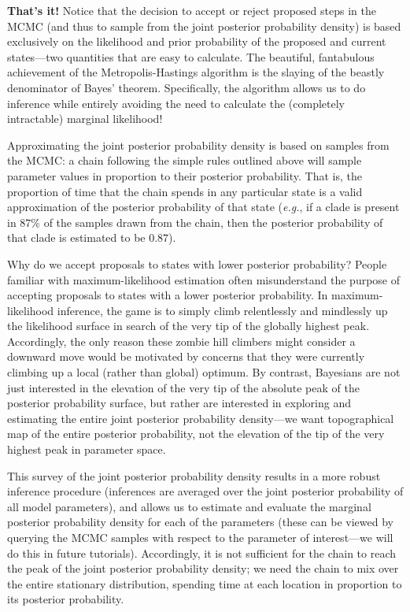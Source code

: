 \documentclass[11pt]{article}
\begin{document}
\textbf{That’s it!} Notice that the decision to accept or reject proposed steps in the MCMC (and thus to sample from the joint posterior probability density) is based exclusively on the likelihood and prior probability of the proposed and current states---two quantities that are easy to calculate. 
The beautiful, fantabulous achievement of the Metropolis-Hastings algorithm is the slaying of the beastly denominator of Bayes’ theorem. 
Specifically, the algorithm allows us to do inference while entirely avoiding the need to calculate the (completely intractable) marginal likelihood!

Approximating the joint posterior probability density is based on samples from the MCMC: a chain following the simple rules outlined above will sample parameter values in proportion to their posterior probability. 
That is, the proportion of time that the chain spends in any particular state is a valid approximation of the posterior probability of that state ({\it e.g.}, if a clade is present in $87\%$ of the samples drawn from the chain, then the posterior probability of that clade is estimated to be $0.87$).

Why do we accept proposals to states with lower posterior probability? 
People familiar with maximum-likelihood estimation often misunderstand the purpose of accepting proposals to states with a lower posterior probability. 
In maximum-likelihood inference, the game is to simply climb relentlessly and mindlessly up the likelihood surface in search of the very tip of the globally highest peak. 
Accordingly, the only reason these zombie hill climbers might consider a downward move would be motivated by concerns that they were currently climbing up a local (rather than global) optimum. 
By contrast, Bayesians are not just interested in the elevation of the very tip of the absolute peak of the posterior probability surface, but rather are interested in exploring and estimating the entire joint posterior probability density---we want topographical map of the entire posterior probability, not the elevation of the tip of the very highest peak in parameter space.

This survey of the joint posterior probability density results in a more robust inference procedure (inferences are averaged over the joint posterior probability of all model parameters), and allows us to estimate and evaluate the marginal posterior probability density for each of the parameters (these can be viewed by querying the MCMC samples with respect to the parameter of interest---we will do this in future tutorials). 
Accordingly, it is not sufficient for the chain to reach the peak of the joint posterior probability density; we need the chain to mix over the entire stationary distribution, spending time at each location in proportion to its posterior probability.
\end{document}
